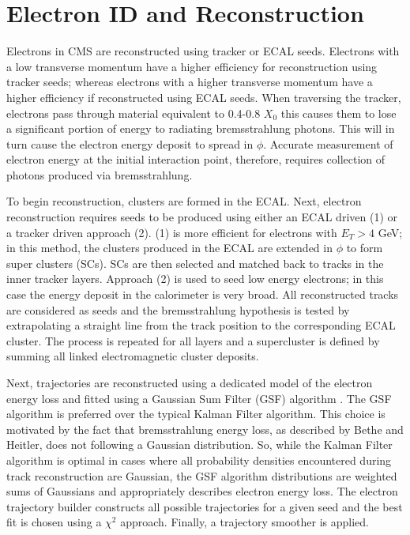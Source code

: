 \section{Electron ID and Reconstruction}
\label{sec:electronReco}
Electrons in CMS are reconstructed using tracker or ECAL seeds.
Electrons with a low transverse momentum have a higher efficiency
for reconstruction using tracker seeds; whereas electrons with a
higher transverse momentum have a higher efficiency if reconstructed
using ECAL seeds. When traversing the tracker, electrons pass through 
material equivalent to 0.4-0.8 $X_{0}$ 
this causes them to lose a significant portion of 
energy to radiating bremsstrahlung photons. 
This will in turn cause the electron energy deposit to spread in $\phi$. 
Accurate measurement of electron energy 
at the initial interaction point, therefore,
requires collection of photons produced via bremsstrahlung.

To begin reconstruction, 
clusters are formed in the ECAL.%
Next, electron reconstruction requires
seeds to be produced using either an ECAL driven (1) or a tracker driven approach (2).
(1) is more efficient for electrons with $E_{T}>4$ GeV;
in this method, the clusters produced in the ECAL are
extended in $\phi$ to form super clusters (SCs). 
SCs are then selected and matched back to tracks in the inner tracker layers. 
Approach (2) is used to seed
low energy electrons; in this case the energy deposit in the calorimeter
is very broad. All reconstructed tracks are considered as seeds
and the bremsstrahlung hypothesis is tested
by extrapolating a straight line from the track position to the
corresponding ECAL cluster. The process is 
repeated for all layers and a supercluster is defined
by summing all linked electromagnetic cluster deposits. 

Next, trajectories are reconstructed using a dedicated
model of the electron energy loss and fitted using a Gaussian Sum Filter (GSF) algorithm \cite{GSF}. 
The GSF algorithm is preferred over the typical Kalman Filter algorithm.
This choice is motivated by the fact that bremsstrahlung energy loss, 
as described by Bethe and Heitler, 
does not following a Gaussian distribution. 
So, while the Kalman Filter algorithm is optimal in cases where all probability
densities encountered during track reconstruction are Gaussian,
the GSF algorithm distributions are weighted sums of Gaussians and
appropriately describes electron energy loss.
The electron trajectory builder constructs all possible trajectories
for a given seed and the best fit is chosen using a $\chi^{2}$ approach.
Finally, a trajectory smoother is applied.

